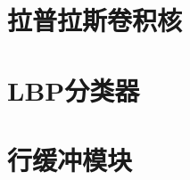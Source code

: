 \documentclass[12pt, a4paper, oneside]{ctexbook}
\begin{document}
	\section{拉普拉斯卷积核}
	\section{LBP分类器}
	\section{行缓冲模块}
	
	
	
\end{document}
